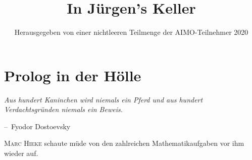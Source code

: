 \documentclass[oneside]{memoir}
\title{In Jürgen's Keller}
\author{Herausgegeben von einer nichtleeren Teilmenge der AIMO-Teilnehmer 2020}
\makeatletter
\newenvironment{chapquote}[2][2em]
  {\setlength{\@tempdima}{#1}%
   \def\chapquote@author{#2}%
   \parshape 1 \@tempdima \dimexpr\textwidth-2\@tempdima\relax%
   \itshape}
  {\par\normalfont\hfill--\ \chapquote@author\hspace*{\@tempdima}\par\bigskip}
\makeatother
\begin{document}
\begin{titlingpage}
\maketitle
\end{titlingpage}
\chapter{Prolog in der Hölle}

\begin{chapquote}{Fyodor Dostoevsky}
\glqq Aus hundert Kaninchen wird niemals ein Pferd und aus hundert Verdachtsgründen niemals ein Beweis.\grqq
\end{chapquote}

\lettrine{M}{arc Hieke} schaute müde von den zahlreichen Mathematikaufgaben vor ihm wieder auf.
\end{document}
